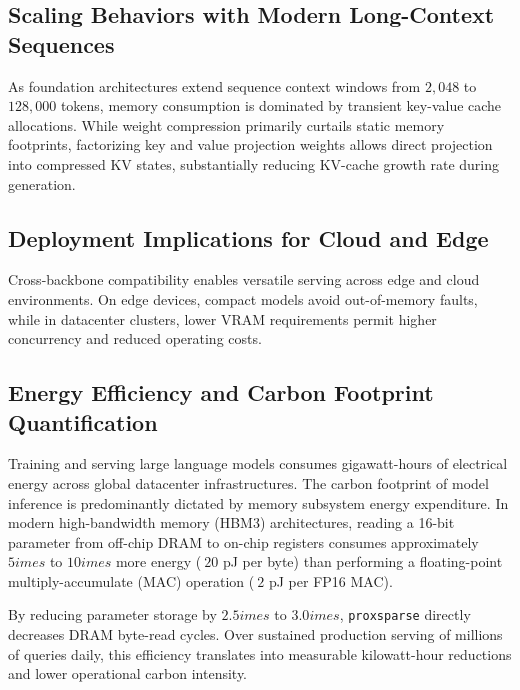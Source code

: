 \subsection{Scaling Behaviors with Modern Long-Context Sequences}
As foundation architectures extend sequence context windows from $2{,}048$ to $128{,}000$ tokens, memory consumption is dominated by transient key-value cache allocations. While weight compression primarily curtails static memory footprints, factorizing key and value projection weights allows direct projection into compressed KV states, substantially reducing KV-cache growth rate during generation.

\subsection{Deployment Implications for Cloud and Edge}
Cross-backbone compatibility enables versatile serving across edge and cloud environments. On edge devices, compact models avoid out-of-memory faults, while in datacenter clusters, lower VRAM requirements permit higher concurrency and reduced operating costs.

\subsection{Energy Efficiency and Carbon Footprint Quantification}
Training and serving large language models consumes gigawatt-hours of electrical energy across global datacenter infrastructures. The carbon footprint of model inference is predominantly dictated by memory subsystem energy expenditure. In modern high-bandwidth memory (HBM3) architectures, reading a 16-bit parameter from off-chip DRAM to on-chip registers consumes approximately $5	imes$ to $10	imes$ more energy ($~20$ pJ per byte) than performing a floating-point multiply-accumulate (MAC) operation ($~2$ pJ per FP16 MAC).

By reducing parameter storage by $2.5	imes$ to $3.0	imes$, \texttt{proxsparse} directly decreases DRAM byte-read cycles. Over sustained production serving of millions of queries daily, this efficiency translates into measurable kilowatt-hour reductions and lower operational carbon intensity.
